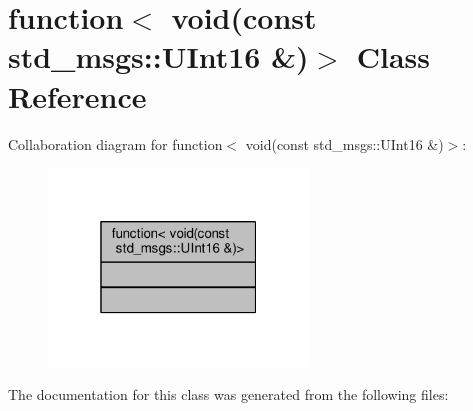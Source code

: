 \hypertarget{classstd_1_1function_3_01void_07const_01std__msgs_1_1UInt16_01_6_08_4}{}\section{function$<$ void(const std\+\_\+msgs\+:\+:U\+Int16 \&)$>$ Class Reference}
\label{classstd_1_1function_3_01void_07const_01std__msgs_1_1UInt16_01_6_08_4}


Collaboration diagram for function$<$ void(const std\+\_\+msgs\+:\+:U\+Int16 \&)$>$\+:\nopagebreak
\begin{figure}[H]
\begin{center}
\leavevmode
\includegraphics[width=196pt]{classstd_1_1function_3_01void_07const_01std__msgs_1_1UInt16_01_6_08_4__coll__graph}
\end{center}
\end{figure}


The documentation for this class was generated from the following files\+: